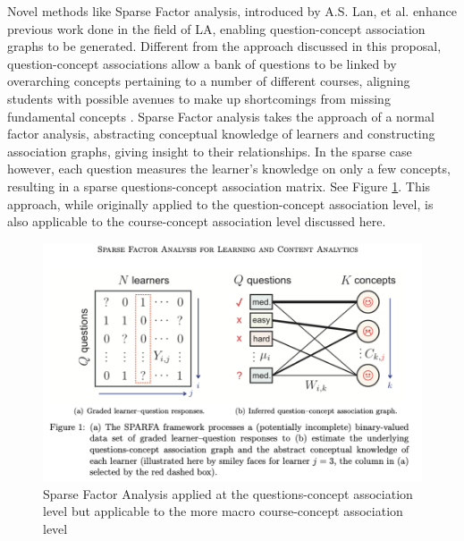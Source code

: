 \indent Novel methods like Sparse Factor analysis, introduced by A.S. Lan, et al. enhance previous work done in the field of LA, enabling question-concept association graphs 
to be generated. Different from the approach discussed in this proposal, question-concept associations allow a bank of questions to be linked by overarching concepts pertaining 
to a number of different courses, aligning students with possible avenues to make up shortcomings from missing fundamental concepts \cite{lan_sparse_nodate}
\cite{willcox_network_2017}. Sparse Factor analysis takes the approach of a normal factor analysis, abstracting conceptual knowledge of learners and constructing 
association graphs, giving insight to their relationships. In the sparse case however, each question measures the learner’s knowledge on only a few concepts, resulting in a 
sparse questions-concept association matrix.  See Figure \ref{fig:sparfa}. This approach, while originally applied to the question-concept association level, is also applicable 
to the course-concept association level discussed here. 




\begin{figure}[ht]
\centering

\includegraphics[width = \textwidth]{Content/images/sparfa.png}
\caption{Sparse Factor Analysis applied at the questions-concept association level but applicable to the more macro course-concept association level}
\label{fig:sparfa}
\end{figure}










